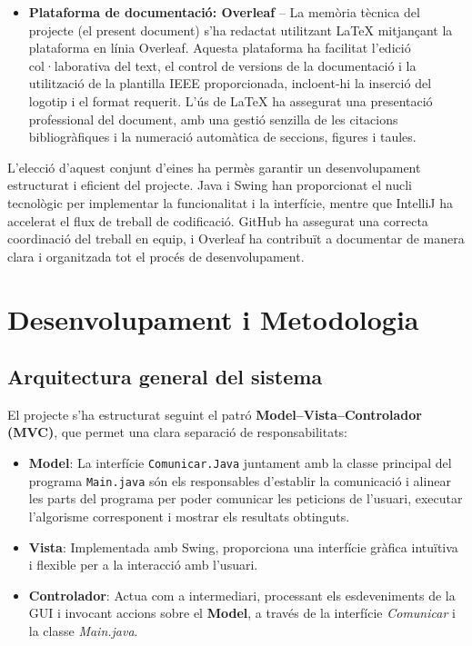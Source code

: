 \documentclass{ieeetj}
\begin{document}
\begin{itemize}
    \item \textbf{Plataforma de documentació: Overleaf} – La memòria tècnica del projecte (el present document) s’ha redactat utilitzant LaTeX mitjançant la plataforma en línia Overleaf. \newline Aquesta plataforma ha facilitat l’edició col·laborativa del text, el control de versions de la documentació i la utilització de la plantilla IEEE proporcionada, incloent-hi la inserció del logotip i el format requerit. \newline
    L’ús de LaTeX ha assegurat una presentació professional del document, amb una gestió senzilla de les citacions bibliogràfiques i la numeració automàtica de seccions, figures i taules.
\end{itemize}

L’elecció d’aquest conjunt d’eines ha permès garantir un desenvolupament estructurat i eficient del projecte. Java i Swing han proporcionat el nucli tecnològic per implementar la funcionalitat i la interfície, mentre que IntelliJ ha accelerat el flux de treball de codificació. GitHub ha assegurat una correcta coordinació del treball en equip, i Overleaf ha contribuït a documentar de manera clara i organitzada tot el procés de desenvolupament.



\section{Desenvolupament i Metodologia}




\subsection{Arquitectura general del sistema}
El projecte s'ha estructurat seguint el patró \textbf{Model–Vista–Controlador (MVC)}, que permet una clara separació de responsabilitats:
\begin{itemize}
    \item \textbf{Model}: La interfície \texttt{Comunicar.Java} juntament amb la classe principal del programa \texttt{Main.java} són els responsables d'establir la comunicació i alinear les parts del programa per poder comunicar les peticions de l'usuari, executar l'algorisme corresponent i mostrar els resultats obtinguts.
    
    \item \textbf{Vista}: Implementada amb Swing, proporciona una interfície gràfica intuïtiva i flexible per a la interacció amb l'usuari. 

\item \textbf{Controlador}: Actua com a intermediari, processant els esdeveniments de la GUI i invocant accions sobre el \textbf{Model}, a través de la interfície \textit{Comunicar} i la classe \textit{Main.java}.
\end{itemize}
\end{document}
